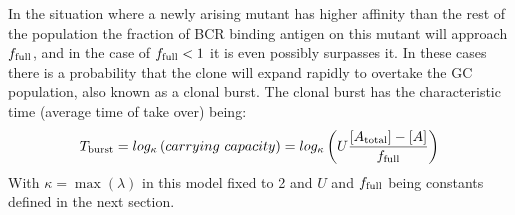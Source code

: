 In the situation where a newly arising mutant has higher affinity than the rest of the population the fraction of BCR binding antigen on this mutant will approach $f_{\text{full}}$, and in the case of $f_{\text{full}} < 1$ it is even possibly surpasses it.
In these cases there is a probability that the clone will expand rapidly to overtake the GC population, also known as a clonal burst.
The clonal burst has the characteristic time (average time of take over) being:
$$
T_{\text{burst}} = log_\kappa \left(carrying\ capacity \right) = log_\kappa\left( U \frac{[A_{\text{total}}] - [A]}{f_{\text{full}}} \right)
$$
With $\kappa = \operatorname{max}(\lambda)$ in this model fixed to 2 and $U$ and $f_{\text{full}}$ being constants defined in the next section.







